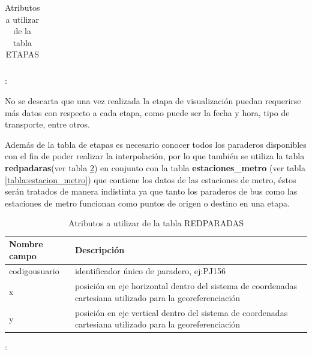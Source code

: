 \documentclass[12pt]{article}
\begin{document}
\begin{table}[h]
\begin{center}
\begin{tabular}{| l | p{7cm} |}
  \end{tabular}
\end{center}
\caption{Atributos a utilizar de la tabla ETAPAS}:
\label{tabla:etapa}
\end{table}

No se descarta que una vez realizada la etapa de visualización puedan requerirse más datos con respecto a cada etapa, como puede ser la fecha y hora, tipo de transporte, entre otros.

Además de la tabla de etapas es necesario conocer todos los paraderos disponibles con el fin de poder realizar la interpolación, por lo que también se utiliza la tabla \textbf{redpadaras}(ver tabla \ref{tabla:paradero}) en conjunto con la tabla \textbf{estaciones\_metro} (ver tabla \ref{tabla:estacion_metro}) que contiene los datos de las estaciones de metro, éstos serán tratados de manera indistinta ya que tanto los paraderos de bus como las estaciones de metro funcionan como puntos de origen o destino en una etapa.

\begin{table}[H]
\begin{center}
  \begin{tabular}{| l | p{7cm} |}
    \hline
    Nombre campo & Descripción \\ \hline \hline
    codigousuario & identificador único de paradero, ej:PJ156 \\ \hline
    x & posición en eje horizontal dentro del sistema de coordenadas cartesiana utilizado para la georeferenciación \\ \hline
    y & posición en eje vertical dentro del sistema de coordenadas cartesiana utilizado para la georeferenciación \\ \hline
  \end{tabular}
\end{center}
\caption{Atributos a utilizar de la tabla REDPARADAS}:
\label{tabla:paradero}
\end{table}
\end{document}
